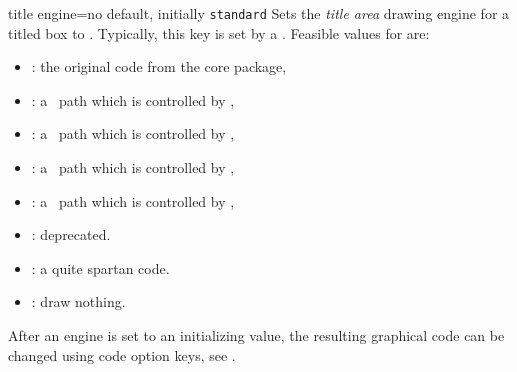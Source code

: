\begin{docTcbKey}{title engine}{=}{no default, initially \texttt{standard}}
  Sets the \emph{title area} drawing engine for a titled box to .
  Typically, this key is set by a .
  Feasible values for  are:
  \begin{itemize}
  \item{}: the original code from the core package,
  \item{}: a \tikzname\ path which is controlled by ,
  \item{}: a \tikzname\ path which is controlled by ,
  \item{}: a \tikzname\ path which is controlled by ,
  \item{}: a \tikzname\ path which is controlled by ,
  \item{}: deprecated.
  \item{}: a quite spartan code.
  \item{}: draw nothing.
  \end{itemize}
\end{docTcbKey}

\begin{marker}
After an engine is set to an initializing value, the resulting graphical
code can be changed using code option keys, see .
\end{marker}

